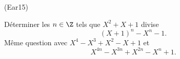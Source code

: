 \begin{tiny}(Ear15)\end{tiny} Déterminer les $n\in \Z$ tels que $X^2+X+1$ divise 
\[
  (X+1)^n - X^n -1.
\]
Même question avec $X^4 - X^3 + X^2 - X +1$ et
\[
  X^{4n} - X^{3n} + X^{2n} - X^n + 1.
\]
